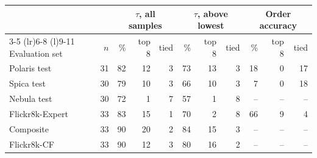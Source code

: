 \begin{tabular}{lrrrrrrrrrr}
\toprule
& & \multicolumn{3}{c}{$\tau$, all samples} & \multicolumn{3}{c}{$\tau$, above lowest} & \multicolumn{3}{c}{Order accuracy} \\
\cmidrule(lr){3-5} \cmidrule(lr){6-8} \cmidrule(l){9-11}
Evaluation set & $n$ & \% & top 8 & tied & \% & top 8 & tied & \% & top 8 & tied \\
\midrule
Polaris test & 31 & 82 & 12 & 3 & 73 & 13 & 3 & 18 & 0 & 17 \\
Spica test & 30 & 79 & 10 & 3 & 66 & 10 & 3 & 7 & 0 & 18 \\
Nebula test & 30 & 72 & 1 & 7 & 57 & 1 & 8 & -- & -- & -- \\
\addlinespace
Flickr8k-Expert & 33 & 83 & 15 & 1 & 70 & 2 & 8 & 66 & 9 & 4 \\
Composite & 33 & 90 & 20 & 2 & 84 & 15 & 3 & -- & -- & -- \\
Flickr8k-CF & 33 & 90 & 12 & 3 & 80 & 16 & 2 & -- & -- & -- \\
\bottomrule
\end{tabular}
